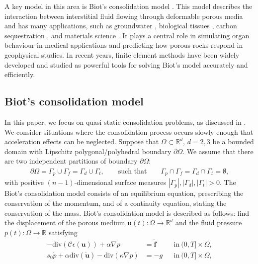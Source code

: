 \documentclass{amsart}
\begin{document}
A key model in this area is Biot’s consolidation model \cite{biot1941general}. This model describes the interaction between interstitial fluid flowing through deformable porous media and has many applications, such as groundwater \cite{Kim1999549}, biological tissues \cite{Swan200325}, carbon sequestration \cite{WANGEN2016486}, and materials science \cite{MR2273503}. It plays a central role in simulating organ behaviour in medical applications and predicting how porous rocks respond in geophysical studies. In recent years, finite element methods have been widely developed and studied as powerful tools for solving Biot’s model accurately and efficiently.

\subsection{Biot’s consolidation model}
In this paper, we focus on quasi static consolidation problems, as discussed in \cite{MR3803860}. We consider situations where the consolidation process occurs slowly enough that acceleration effects can be neglected. Suppose that $\Omega \subset \mathbb{R}^d$, $d =2,3$ be a bounded domain with Lipschitz polygonal/polyhedral boundary $\partial \Omega$. We assume that there are two independent partitions of boundary $\partial \Omega$:
\begin{align*}
	\partial \Omega = \Gamma_p \cup  \Gamma_{f} = \Gamma_d \cup  \Gamma_t, \qquad \text{such that} \qquad  \Gamma_p \cap  \Gamma_{f} = \Gamma_d \cap  \Gamma_t = \emptyset,
\end{align*}
with positive $(n-1)$-dimensional surface measures $|\Gamma_p|, |\Gamma_d|, |\Gamma_t|>0$. The Biot’s consolidation model consists of an equilibrium equation, prescribing the conservation of the momentum, and of a continuity equation, stating the conservation of the mass. Biot’s consolidation model is described as follows: find the displacement of the porous medium $\boldsymbol{u}(t): \Omega \rightarrow \mathbb{R}^{d}$ and the fluid pressure $p(t): \Omega \rightarrow \mathbb{R}$ satisfying
\begin{subequations}
    \label{sys-eqs}
\begin{align}
	\label{sys1} - \text{div} (\boldsymbol{\mathcal{C}} \epsilon(\boldsymbol{u})) + \alpha \nabla p &= \tilde{\boldsymbol{f}} && \text{in} \ (0,T] \times \Omega,\\
	\label{sys2} s_{0} \dot{p} + \alpha \text{div}(\dot{\boldsymbol{u}}) -  \text{div} (\kappa \nabla p) &= -g && \text{in} \ (0,T] \times \Omega,
\end{align}
\end{subequations}
\end{document}

